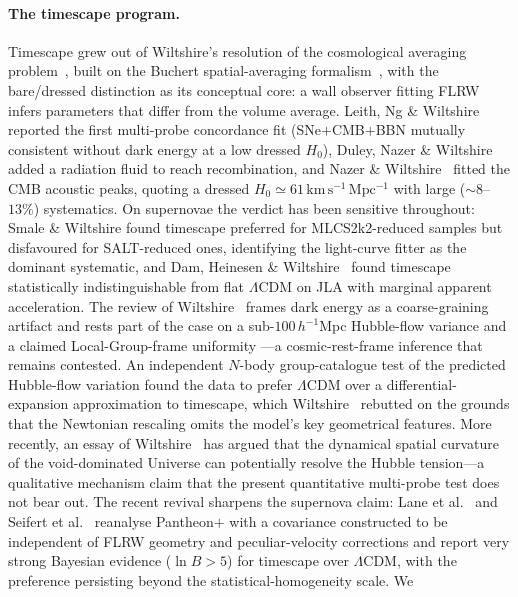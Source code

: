 \documentclass[aps,prd,twocolumn,nofootinbib,superscriptaddress,floatfix]{revtex4-2}
\newcommand{\Ho}{H_{0}}
\newcommand{\kmsmpc}{\,\mathrm{km\,s^{-1}\,Mpc^{-1}}}
\newcommand{\Lcdm}{\Lambda\mathrm{CDM}}
\begin{document}
\paragraph*{The timescape program.} Timescape grew out of Wiltshire's resolution of
the cosmological averaging problem~\cite{Wiltshire2007,Wiltshire2009}, built on
the Buchert spatial-averaging formalism~\cite{Buchert2000}, with the bare/dressed
distinction as its conceptual core: a wall observer fitting FLRW infers
parameters that differ from the volume average. Leith, Ng \& Wiltshire
\cite{Leith2008} reported the first multi-probe concordance fit (SNe$+$CMB$+$BBN
mutually consistent without dark energy at a low dressed $\Ho$), Duley, Nazer \&
Wiltshire~\cite{Duley2013} added a radiation fluid to reach recombination, and
Nazer \& Wiltshire~\cite{Nazer2015} fitted the CMB acoustic peaks, quoting a
dressed $\Ho\simeq61\kmsmpc$ with large ($\sim8$--$13\%$) systematics. On
supernovae the verdict has been sensitive throughout: Smale \& Wiltshire
\cite{Smale2011} found timescape preferred for MLCS2k2-reduced samples but
disfavoured for SALT-reduced ones, identifying the light-curve fitter as the
dominant systematic, and Dam, Heinesen \& Wiltshire~\cite{Dam2017} found
timescape statistically indistinguishable from flat $\Lcdm$ on JLA with marginal
apparent acceleration. The review of Wiltshire~\cite{Wiltshire2014} frames dark
energy as a coarse-graining artifact and rests part of the case on a sub-$100\,
h^{-1}$Mpc Hubble-flow variance and a claimed Local-Group-frame uniformity
\cite{Wiltshire2013}---a cosmic-rest-frame inference that remains contested. An
independent $N$-body group-catalogue test of the predicted Hubble-flow variation
\cite{Saulder2019} found the data to prefer $\Lcdm$ over a differential-expansion
approximation to timescape, which Wiltshire~\cite{Wiltshire2019comment} rebutted on the
grounds that the Newtonian rescaling omits the model's key geometrical features. More
recently, an essay of Wiltshire~\cite{Wiltshire2024GRF} has argued that the dynamical
spatial curvature of the void-dominated Universe can potentially resolve the Hubble
tension---a qualitative mechanism claim that the present quantitative multi-probe test
does not bear out. The
recent revival sharpens the supernova claim: Lane et al.~\cite{Lane2025} and
Seifert et al.~\cite{Seifert2024} reanalyse Pantheon$+$ with a covariance
constructed to be independent of FLRW geometry and peculiar-velocity corrections
and report very strong Bayesian evidence ($\ln B>5$) for timescape over $\Lcdm$,
with the preference persisting beyond the statistical-homogeneity scale. We
\end{document}
